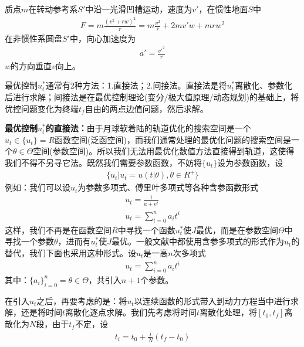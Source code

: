             质点$m$在转动参考系$S'$中沿一光滑凹槽运动，速度为$v'$，在惯性地面$S$中
            \begin{align*}
            F = m\frac{(v^2+rw)^2}{r} = m\frac{v^2}{r}+2mv'w+mrw^2
            \end{align*}
            在非惯性系圆盘$S'$中，向心加速度为
            \begin{align*}
            a' = \frac{v'^2}{r}
            \end{align*}
            $w$的方向垂直$v$向上。
            \par
            最优控制$u_t^*$通常有2种方法：1.直接法；2.间接法。直接法是将$u_t^*$离散化、参数化后进行求解；间接法是在最优控制理论(变分/极大值原理/动态规划)的基础上，将优控问题变化为终端$t_f$自由的两点边值问题，然后求解。
            \par
            \textbf{最优控制$u_t^*$的直接法：}由于月球软着陆的轨道优化的搜索空间是一个$u_t\in \{u_t\} = R$函数空间(泛函空间)，而我们通常处理的最优化问题的搜索空间是一个$\theta\in \Theta$空间(参数空间)。所以我们无法用最优化数值方法直接得到轨道，这使得我们不得不另寻它法。既然我们需要参数函数，不妨将$\{u_t\}$设为参数函数，设
            \begin{align*}
            \{u_t|u_t = u(t|\theta),\theta\in R^+\}
            \end{align*}
            例如：我们可以设$u_t$为参数多项式、傅里叶多项式等各种含参函数形式
            \begin{align*}
            u_t = \frac{1}{a+e^t}\\
            u_t = \sum_{t=0}^n a_i t^i
            \end{align*}
            这样，我们不再是在函数空间$R$中寻找一个函数$u_t^*$使$J$最优，而是在参数空间$\Theta$中寻找一个参数$\theta$，进而有$u_t^*$使$J$最优。一般文献中都使用含参多项式的形式作为$u_t$的替代，我们下面也采用这种形式。设$u_t$是一高$n$次多项式
            \begin{align*}
            u_t = \sum_{i=0}^na_it^i
            \end{align*}
            其中：$\{a_i\}_{i=0}^n = \theta\in \Theta$，共引入$n+1$个参数。
            \par
            在引入$u_t$之后，再要考虑的是：将$u_t$以连续函数的形式带入到动力方程当中进行求解，还是将时间$t$离散化逐点求解。我们先考虑将时间$t$离散化处理，将$[t_0,t_f]$离散化为$N$段，由于$t_f$不定，设
            \begin{align*}
            t_i = t_0 + \frac{i}{N}(t_f-t_0)
            \end{align*}
